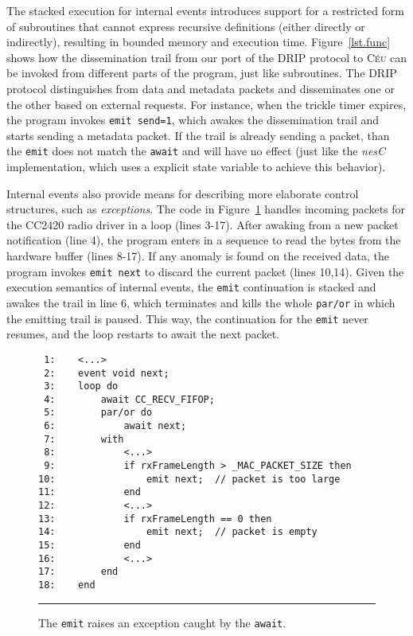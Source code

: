 \documentclass[10pt]{sensys-proc}
\newcommand{\CEU}{\textsc{C\'{e}u}\xspace}
\newcommand{\code}[1] {{\small{\texttt{#1}}}}
\begin{document}
The stacked execution for internal events introduces support for a restricted 
form of subroutines that cannot express recursive definitions (either directly 
or indirectly), resulting in bounded memory and execution time.
%
Figure~\ref{lst.func} shows how the dissemination trail from our port of the 
DRIP protocol to \CEU can be invoked from different parts of the program, just 
like subroutines.
The DRIP protocol distinguishes from data and metadata packets and disseminates 
one or the other based on external requests.
For instance, when the trickle timer expires, the program invokes 
\code{emit~send=1}, which awakes the dissemination trail and starts sending a 
metadata packet.
If the trail is already sending a packet, than the \code{emit} does not match 
the \code{await} and will have no effect (just like the \emph{nesC} 
implementation, which uses a explicit state variable to achieve this behavior).


Internal events also provide means for describing more elaborate control 
structures, such as \emph{exceptions}.
The code in Figure~\ref{lst.exception} handles incoming packets for the CC2420 
radio driver in a loop (lines 3-17).
After awaking from a new packet notification (line 4), the program enters in a 
sequence to read the bytes from the hardware buffer (lines 8-17).
If any anomaly is found on the received data, the program invokes 
\code{emit~next} to discard the current packet (lines 10,14).
Given the execution semantics of internal events, the \code{emit} continuation 
is stacked and awakes the trail in line 6, which terminates and kills the whole 
\code{par/or} in which the emitting trail is paused.
This way, the continuation for the \code{emit} never resumes, and the loop 
restarts to await the next packet.


\begin{figure}[t]
{\small
\begin{verbatim}
 1:    <...>
 2:    event void next;
 3:    loop do
 4:        await CC_RECV_FIFOP;
 5:        par/or do
 6:            await next;
 7:        with
 8:            <...>
 9:            if rxFrameLength > _MAC_PACKET_SIZE then
10:                emit next;  // packet is too large
11:            end
12:            <...>
13:            if rxFrameLength == 0 then
14:                emit next;  // packet is empty
15:            end
16:            <...>
17:        end
18:    end
\end{verbatim}
}
\rule{8.5cm}{0.37pt}
\caption{ The \code{emit} raises an exception caught by the \code{await}.
\label{lst.exception}
}
\end{figure}
\end{document}
